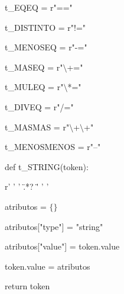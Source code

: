 \begin{multicols}{2}

t\_EQEQ = r"=="

t\_DISTINTO = r"!="

t\_MENOSEQ = r"-="

t\_MASEQ = r"$\setminus$+="

t\_MULEQ = r"$\setminus$*="

t\_DIVEQ = r"/="

t\_MASMAS = r"$\setminus$+$\setminus$+"

t\_MENOSMENOS = r"--"

\columnbreak

def t\_STRING(token):

\hspace{5mm}    r' ' ' \" .*? \" ' ' '
    
\hspace{5mm}    atributos = $\{ \} $
    
\hspace{5mm}    atributos["type"] = "string"
    
\hspace{5mm}    atributos["value"] = token.value
    
\hspace{5mm}    token.value = atributos
    
\hspace{5mm}    return token
 
\end{multicols} 
    
